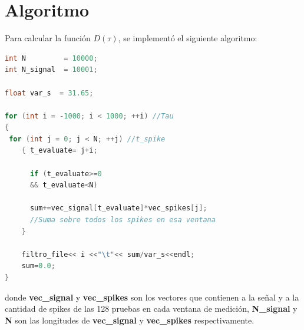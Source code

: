 \appendix
\section{Algoritmo} \label{algor}

Para calcular la función $D(\tau)$, se implementó  el siguiente algoritmo:

\begin{lstlisting}[language=C++]
int N  		  = 10000;
int N_signal  = 10001;

float var_s  = 31.65;

for (int i = -1000; i < 1000; ++i) //Tau
{
 for (int j = 0; j < N; ++j) //t_spike
 	{ t_evaluate= j+i;
	  
	  if (t_evaluate>=0 
	  && t_evaluate<N) 

	  sum+=vec_signal[t_evaluate]*vec_spikes[j];
	  //Suma sobre todos los spikes en esa ventana
	}
	
	filtro_file<< i <<"\t"<< sum/var_s<<endl;
	sum=0.0;
}
\end{lstlisting}
donde \textbf{vec\_signal} y \textbf{vec\_spikes} son los vectores que contienen a la señal y a la cantidad de spikes de las 128 pruebas en cada ventana de medición, \textbf{N\_signal} y \textbf{N} son las longitudes de \textbf{vec\_signal} y \textbf{vec\_spikes} respectivamente.



